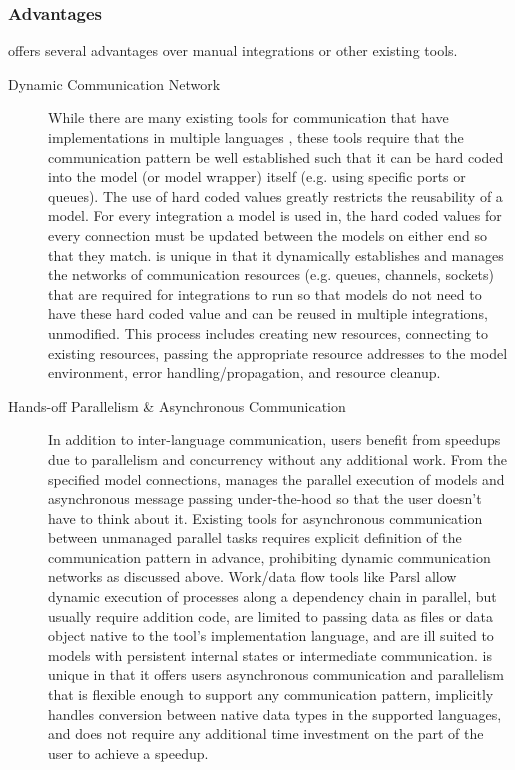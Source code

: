 \documentclass[journal]{IEEEtran}
\newcommand{\todo}[1]{{\color{red}{#1}}}
\newcommand{\pkg}{{\tt \todo{cis\_interface}}{}}
\begin{document}
\subsubsection{Advantages}\label{SS:advantages}
%
{\pkg} offers several advantages over manual integrations or other existing tools.
%
\begin{description}
	\item[Dynamic Communication Network] While there are many existing tools for communication that have implementations in multiple languages \citep[some of which {\pkg} uses, e.g.][ZMQ, RabbitMQ, OpenMPI]{ZMQ, RMQ, Gabriel2004}, these tools require that the communication pattern be well established such that it can be hard coded into the model (or model wrapper) itself (e.g. using specific ports or queues). The use of hard coded values greatly restricts the reusability of a model. For every integration a model is used in, the hard coded values for every connection must be updated between the models on either end so that they match. {\pkg} is unique in that it dynamically establishes and manages the networks of communication resources (e.g. queues, channels, sockets) that are required for integrations to run so that models do not need to have these hard coded value and can be reused in multiple integrations, unmodified. This process includes creating new resources, connecting to existing resources, passing the appropriate resource addresses to the model environment, error handling/propagation, and resource cleanup. 
	\item[Hands-off Parallelism \& Asynchronous Communication] In addition to inter-language communication, {\pkg} users benefit from speedups due to parallelism and concurrency without any additional work. From the specified model connections, {\pkg} manages the parallel execution of models and asynchronous message passing under-the-hood so that the user doesn't have to think about it. Existing tools for asynchronous communication between unmanaged parallel tasks \citep[e.g. Jack2,][]{Magoules2018} requires explicit definition of the communication pattern in advance, prohibiting dynamic communication networks as discussed above. Work/data flow tools like Parsl \citep{babuji18} allow dynamic execution of processes along a dependency chain in parallel, but usually require addition code, are limited to passing data as files or data object native to the tool's implementation language, and are ill suited to models with persistent internal states or intermediate communication. {\pkg} is unique in that it offers users asynchronous communication and parallelism that is flexible enough to support any communication pattern, implicitly handles conversion between native data types in the supported languages, and does not require any additional time investment on the part of the user to achieve a speedup.

\end{description}
\end{document}
